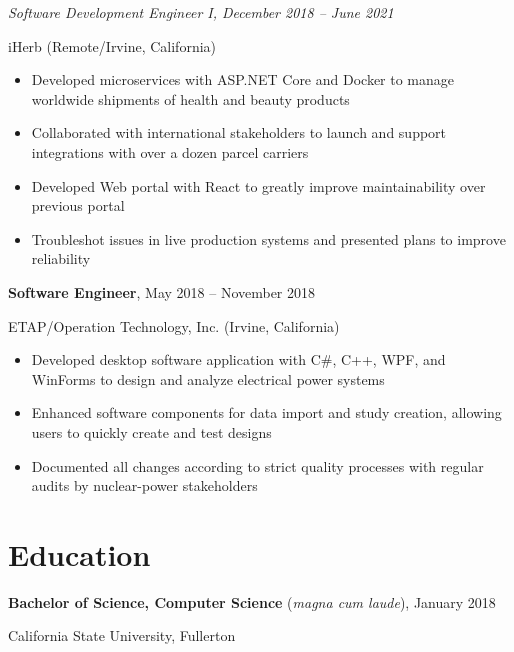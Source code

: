 \documentclass[11pt]{article}
\newcommand{\titleheader}[2]{\textbf{#1}, #2}
\newcommand{\titleextraheader}[3]{\textbf{#1} (#3), #2}
\newcommand{\secondaryheader}[1]{\hspace{2.25em} \textit{#1}}
\newcommand{\locheader}[2]{#1 (#2)}
\newcommand{\instheader}[1]{#1}
\begin{document}
	\secondaryheader{Software Development Engineer I, December 2018 -- June 2021}

	\locheader{iHerb}{Remote/Irvine, California}

	\begin{itemize}
		\item Developed microservices with ASP.NET Core and Docker to manage worldwide shipments of health and beauty products
		\item Collaborated with international stakeholders to launch and support integrations with over a dozen parcel carriers
		\item Developed Web portal with React to greatly improve maintainability over previous portal
		\item Troubleshot issues in live production systems and presented plans to improve reliability
	\end{itemize}

	\titleheader{Software Engineer}{May 2018 -- November 2018}

	\locheader{ETAP/Operation Technology, Inc.}{Irvine, California}

	\begin{itemize}
		\item Developed desktop software application with C\#, C++, WPF, and WinForms to design and analyze electrical power systems
		\item Enhanced software components for data import and study creation, allowing users to quickly create and test designs
		\item Documented all changes according to strict quality processes with regular audits by nuclear-power stakeholders
	\end{itemize}

	\section*{Education}

	\titleextraheader{Bachelor of Science, Computer Science}{January 2018}{\textit{magna cum laude}}

	\instheader{California State University, Fullerton}
\end{document}
